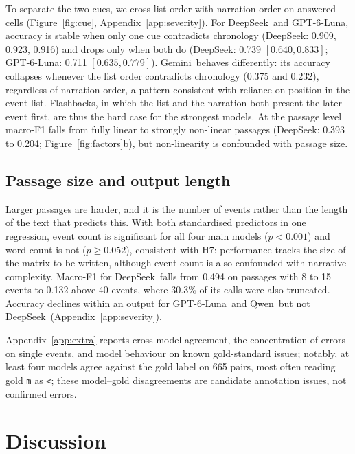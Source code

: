 \documentclass[11pt]{article}
\newcommand{\rel}[1]{\texttt{#1}}
\newcommand{\Ds}{DeepSeek}
\newcommand{\Gp}{GPT-6-Luna}
\newcommand{\Gm}{Gemini}
\newcommand{\Qw}{Qwen}
\begin{document}
To separate the two cues, we cross list order with narration order on answered cells (Figure~\ref{fig:cue}, Appendix~\ref{app:severity}). For \Ds\ and \Gp, accuracy is stable when only one cue contradicts chronology (\Ds: 0.909, 0.923, 0.916) and drops only when both do (\Ds: 0.739 $[0.640, 0.833]$; \Gp: 0.711 $[0.635, 0.779]$). \Gm\ behaves differently: its accuracy collapses whenever the list order contradicts chronology (0.375 and 0.232), regardless of narration order, a pattern consistent with reliance on position in the event list. Flashbacks, in which the list and the narration both present the later event first, are thus the hard case for the strongest models. At the passage level macro-F1 falls from fully linear to strongly non-linear passages (\Ds: 0.393 to 0.204; Figure~\ref{fig:factors}b), but non-linearity is confounded with passage size.

\subsection{Passage size and output length}
\label{sec:length}

Larger passages are harder, and it is the number of events rather than the length of the text that predicts this. With both standardised predictors in one regression, event count is significant for all four main models ($p<0.001$) and word count is not ($p\geq 0.052$), consistent with H7: performance tracks the size of the matrix to be written, although event count is also confounded with narrative complexity. Macro-F1 for \Ds\ falls from 0.494 on passages with 8 to 15 events to 0.132 above 40 events, where 30.3\% of its calls were also truncated. Accuracy declines within an output for \Gp\ and \Qw\ but not \Ds\ (Appendix~\ref{app:severity}).

Appendix~\ref{app:extra} reports cross-model agreement, the concentration of errors on single events, and model behaviour on known gold-standard issues; notably, at least four models agree against the gold label on 665 pairs, most often reading gold \rel{m} as \rel{<}; these model--gold disagreements are candidate annotation issues, not confirmed errors.

\section{Discussion}
\label{sec:discussion}
\end{document}
